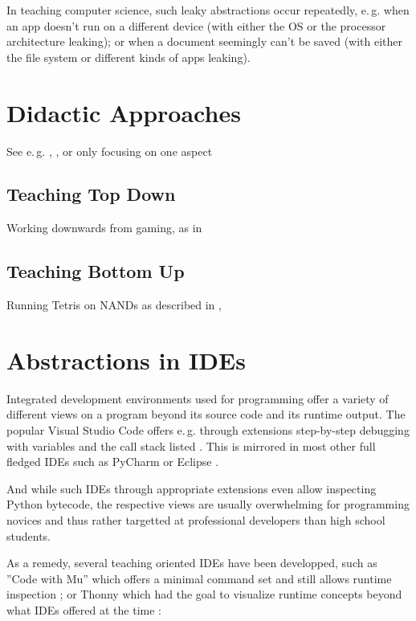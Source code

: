 In teaching computer science, such leaky abstractions occur repeatedly, e.\,g. when an app doesn't run on a different device (with either the OS or the processor architecture leaking); or when a document seemingly can't be saved (with either the file system or different kinds of apps leaking).




\section{Didactic Approaches} \label{sc_didactic}
See e.\,g. \cite{Sch11}, \cite{Mod16}, \cite{Har20} or \cite{Lee20} only focusing on one aspect

\subsection{Teaching Top Down}
Working downwards from gaming, as in \cite{Wei16}

\subsection{Teaching Bottom Up}
Running Tetris on NANDs as described in \cite{Cak17}, \cite{Nis21}


\section{Abstractions in IDEs} \label{sc_ides}

Integrated development environments used for programming offer a variety of different views on a program beyond its source code and its runtime output. The popular Visual Studio Code offers e.\,g. through extensions step-by-step debugging with variables and the call stack listed \cite{Mic25}. This is mirrored in most other full fledged IDEs such as PyCharm \citep{Jet25} or Eclipse \citep{Ecl25}.

And while such IDEs through appropriate extensions even allow inspecting Python bytecode, the respective views are usually overwhelming for programming novices and thus rather targetted at professional developers than high school students.

As a remedy, several teaching oriented IDEs have been developped, such as ''Code with Mu'' which offers a minimal command set and still allows runtime inspection \citep{Tol23}; or Thonny which had the goal to visualize runtime concepts beyond what IDEs offered at the time \citep[p. 119]{Ann15}:

